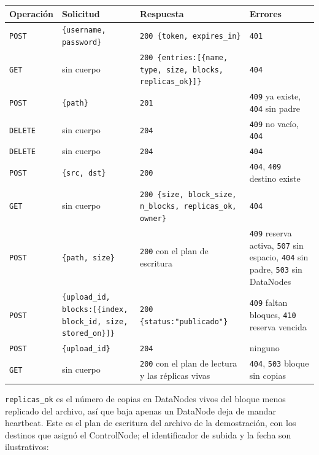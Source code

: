 \documentclass[10pt]{article}
\begin{document}
\begin{xltabular}{\linewidth}{@{}L{3.6cm}YYL{2.9cm}@{}}
\toprule
Operación & Solicitud & Respuesta & Errores \\
\midrule\endhead
\texttt{POST}  & \texttt{\{username, password\}} & \texttt{200 \{token, expires\_in\}} & \texttt{401} \\
\texttt{GET}  & sin cuerpo & \texttt{200 \{entries:[\{name, type, size, blocks, replicas\_ok\}]\}} & \texttt{404} \\
\texttt{POST}  & \texttt{\{path\}} & \texttt{201} & \texttt{409} ya existe, \texttt{404} sin padre \\
\texttt{DELETE}  & sin cuerpo & \texttt{204} & \texttt{409} no vacío, \texttt{404} \\
\texttt{DELETE}  & sin cuerpo & \texttt{204} & \texttt{404} \\
\texttt{POST}  & \texttt{\{src, dst\}} & \texttt{200} & \texttt{404}, \texttt{409} destino existe \\
\texttt{GET}  & sin cuerpo & \texttt{200 \{size, block\_size, n\_blocks, replicas\_ok, owner\}} & \texttt{404} \\
\texttt{POST}  & \texttt{\{path, size\}} & \texttt{200} con el plan de escritura & \texttt{409} reserva activa, \texttt{507} sin espacio, \texttt{404} sin padre, \texttt{503} sin DataNodes \\
\texttt{POST}  & \texttt{\{upload\_id, blocks:[\{index, block\_id, size, stored\_on\}]\}} & \texttt{200 \{status:"publicado"\}} & \texttt{409} faltan bloques, \texttt{410} reserva vencida \\
\texttt{POST}  & \texttt{\{upload\_id\}} & \texttt{204} & ninguno \\
\texttt{GET}  & sin cuerpo & \texttt{200} con el plan de lectura y las réplicas vivas & \texttt{404}, \texttt{503} bloque sin copias \\
\bottomrule
\end{xltabular}

\texttt{replicas\_ok} es el número de copias en DataNodes vivos del bloque menos replicado del archivo, así que baja apenas un DataNode deja de mandar heartbeat. Este es el plan de escritura del archivo de la demostración, con los destinos que asignó el ControlNode; el identificador de subida y la fecha son ilustrativos:
\end{document}
